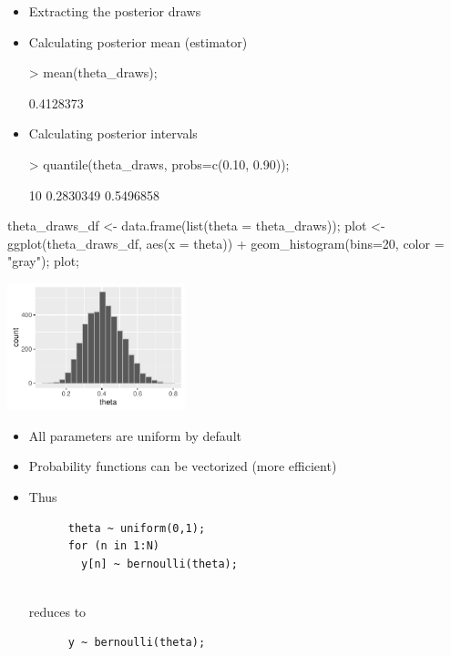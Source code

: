 \documentclass[10pt]{report}
\begin{document}
%
\begin{itemize}
\item Extracting the posterior draws
\item Calculating posterior mean (estimator)
\begin{codein}
> mean(theta_draws);
\end{codein}
\begin{codeout}
[1] 0.4128373
\end{codeout}
\item Calculating posterior intervals
\begin{codein}
> quantile(theta_draws, probs=c(0.10, 0.90));
\end{codein}
\begin{codeout}
      10%
0.2830349 0.5496858 
\end{codeout}
\end{itemize}


%
\begin{codein}
theta_draws_df <- data.frame(list(theta = theta_draws));
plot <-
  ggplot(theta_draws_df, aes(x = theta)) +
  geom_histogram(bins=20, color = "gray");
plot;
\end{codein}
\vspace*{-9pt}
\begin{center}
\includegraphics[height=1.45in]{img/bern-posterior-histogram.pdf}
\end{center}


%
\begin{itemize}
\item All parameters are uniform by default
\item Probability functions can be vectorized (more efficient)
\item Thus
{\small
\begin{Verbatim}
      theta ~ uniform(0,1);
      for (n in 1:N) 
        y[n] ~ bernoulli(theta);
\end{Verbatim}
}
\mbox{ }
\\
{\normalsize reduces to}
\\
{\small
\begin{Verbatim}
      y ~ bernoulli(theta);
\end{Verbatim}
}
\end{itemize}
\end{document}
